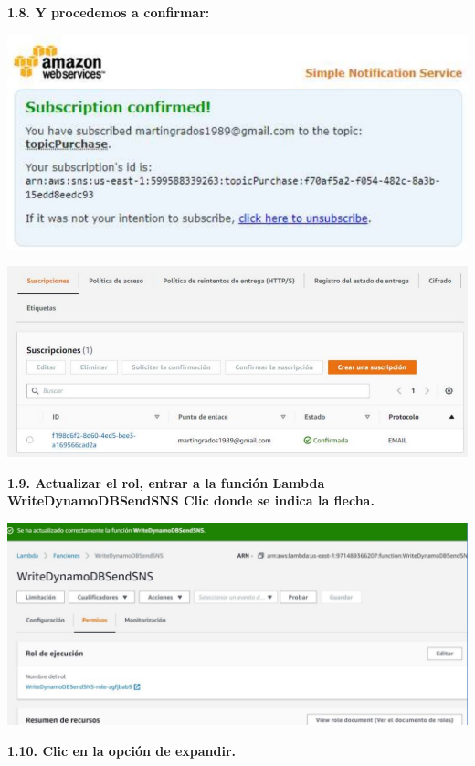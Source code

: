 \documentclass{article}
\begin{document}
	\newpage
\textbf{1.8.  Y procedemos a confirmar:
}

    \begin{center}
		\includegraphics[width=15cm]{./images/8} 
	\end{center}
	
    \begin{center}
		\includegraphics[width=15cm]{./images/9} 
	\end{center}
	
	\newpage
\textbf{1.9.   Actualizar el rol, entrar a la función Lambda WriteDynamoDBSendSNS
Clic donde se indica la flecha.
}

    \begin{center}
		\includegraphics[width=15cm]{./images/10} 
	\end{center}
	
		
	\newpage
\textbf{1.10.  Clic en la opción de expandir.
}
\end{document}
